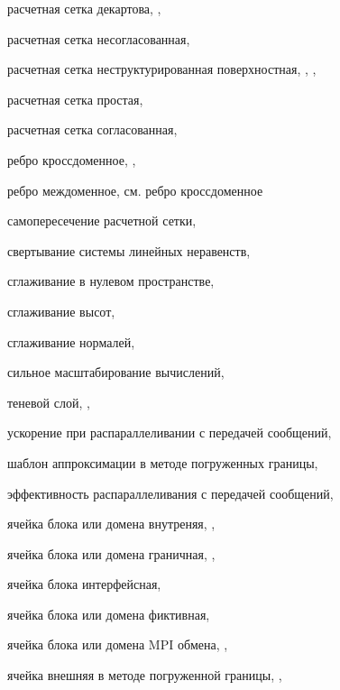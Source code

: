 расчетная сетка декартова, \pageref{term:mesh_descartes}, \pageref{term:mesh_descartes2}

расчетная сетка несогласованная, \pageref{term:mesh_nesoglas}

расчетная сетка неструктурированная поверхностная, \pageref{term:unstruct_surf_calc_mesh}, \pageref{term:unstruct_surf_calc_mesh2}, \pageref{term:unstruct_surf_calc_mesh3}

расчетная сетка простая, \pageref{term:mesh_simple}

расчетная сетка согласованная, \pageref{term:mesh_soglas}

ребро кроссдоменное, \pageref{term:edge_cross}, \pageref{term:edge_cross2}

ребро междоменное, см. ребро кроссдоменное

самопересечение расчетной сетки, \pageref{term:mesh_self_intersect}

свертывание системы линейных неравенств, \pageref{term:method_svert_sys_neravenstv}

сглаживание в нулевом пространстве, \pageref{term:smooth_null}

сглаживание высот, \pageref{term:smooth_height}

сглаживание нормалей, \pageref{term:smooth_norm}

сильное масштабирование вычислений, \pageref{term:strong_scale}

теневой слой, \pageref{term:block_shadow_layer}, \pageref{term:block_shadow_layer2}

ускорение при распараллеливании с передачей сообщений, \pageref{term:msg_speedup}

шаблон аппроксимации в методе погруженных границы, \pageref{term:ibm_template}

эффективность распараллеливания с передачей сообщений, \pageref{term:msg_eff}

ячейка блока или домена внутреняя, \pageref{term:cell_block_inner}, \pageref{term:cell_block_inner2}

ячейка блока или домена граничная, \pageref{term:cell_block_border}, \pageref{term:cell_block_border2}

ячейка блока интерфейсная, \pageref{term:cell_block_interface}

ячейка блока или домена фиктивная, \pageref{term:cell_block_ghost}

ячейка блока или домена MPI обмена, \pageref{term:cell_block_mpi}, \pageref{term:cell_block_mpi2}

ячейка внешняя в методе погруженной границы, \pageref{term:cell_ibm_outer}, \pageref{term:cell_ibm_outer2}

